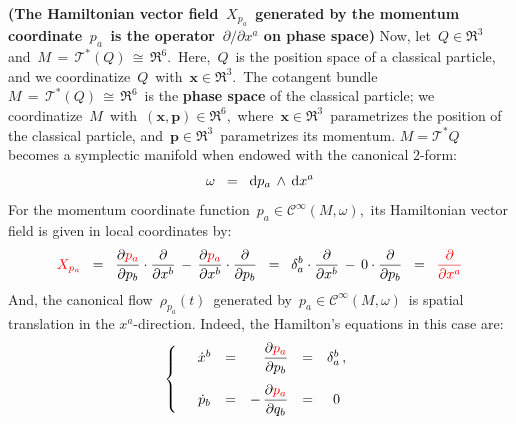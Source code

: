 \vskip 0.5cm
\begin{remark}\label{MomentumHamiltonianVectorFieldIsSpatialDerivative}
\textnormal{\bf(The Hamiltonian vector field \,$X_{p_{a}}$\,
generated by the momentum coordinate \,$p_{a}$\, is
the operator \,$\partial\slash\partial x^{a}$ on phase space)}
\mbox{}
\vskip 0.15cm
\noindent
Now, let \,$Q \in \Re^{3}$\, and \,$M \,=\, \mathcal{T}^{*}(Q) \,\cong\, \Re^{6}$.\,
Here, \,$Q$\, is the position space of a classical particle, and
we coordinatize \,$Q$\, with \,$\mathbf{x} \in \Re^{3}$.\,
The cotangent bundle
\,$M \,=\, \mathcal{T}^{*}(Q) \,\cong\, \Re^{6}$\,
is the \textbf{\color{red}phase space} of the classical particle;
we coordinatize \,$M$\, with
\,$\left(\mathbf{x},\mathbf{p}\right) \in \Re^{6}$,\,
where
\,$\mathbf{x} \in \Re^{3}$\, parametrizes the position of the classical particle, and
\,$\mathbf{p} \in \Re^{3}$\, parametrizes its momentum.
\vskip 0.3cm
\noindent
$M = \mathcal{T}^{*}Q$\, becomes a symplectic manifold when endowed with the canonical $2$-form:
\begin{equation*}
\omega
\;\; = \;\;
	\textnormal{d} p_{a} \,\wedge\, \textnormal{d} x^{a}
\end{equation*}
\vskip 0.3cm
\noindent
For the momentum coordinate function \,$p_{a} \in \mathscr{C}^{\infty}(M,\omega)$,\,
its Hamiltonian vector field is given in local coordinates by:
\begin{equation*}
{\color{red}X_{p_{a}}}
\;\; = \;\;
	\dfrac{\partial {\color{red}p_{a}}}{\partial p_{b}} \cdot \dfrac{\partial}{\partial x^{b}}
	\, - \,
	\dfrac{\partial {\color{red}p_{a}}}{\partial x^{b}} \cdot \dfrac{\partial}{\partial p_{b}}
\;\; = \;\;
	\delta^{b}_{a} \cdot \dfrac{\partial}{\partial x^{b}}
	\, - \,
	0 \cdot \dfrac{\partial}{\partial p_{b}}
\;\; = \;\;
	{\color{red}\dfrac{\partial}{\partial x^{a}}}
\end{equation*}
\vskip 0.3cm
\noindent
And, the canonical flow \,$\rho_{p_{a}}(t)$\, generated by \,$p_{a} \in \mathscr{C}^{\infty}(M,\omega)$\,
is spatial translation in the $x^{a}$-direction.
Indeed, the Hamilton's equations in this case are:
\begin{equation*}
\left\{\quad
\begin{array}{ccccc}
\dot{x}^{b}
& = &
	{\color{white}-}\,\dfrac{\partial {\color{red}p_{a}}}{\partial p_{b}}
& = &
	\delta^{b}_{a}\,,
\\
\dot{p}_{b}
& = &
	\overset{{\color{white}1}}{-\,\dfrac{\partial {\color{red}p_{a}}}{\partial q_{b}}}
& = &
	0
\end{array}
\right.
\end{equation*}

\end{remark}
